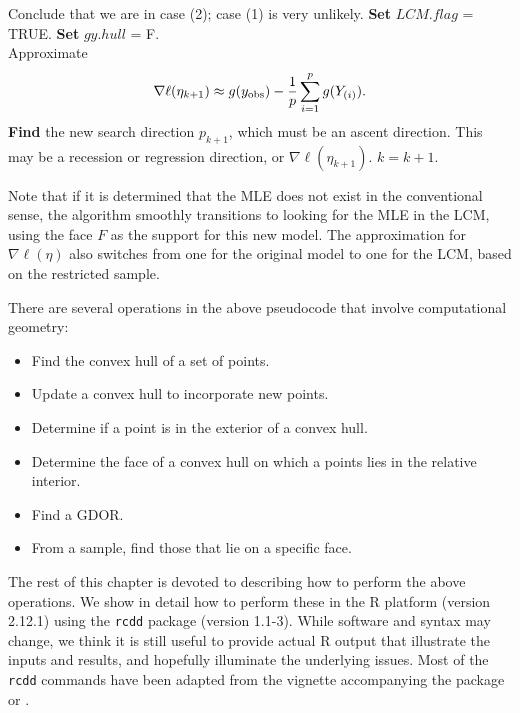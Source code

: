 {\begin{algorithmic}
			\State Conclude that we are in case (2); case (1) is very unlikely.
			\State \textbf{Set} $LCM.flag$ = TRUE.
			\State \textbf{Set} $gy.hull$ = F.
		\EndIf
	\EndIf
\EndIf\\
	\State Approximate 
	\begin{align} \label{E:nabla ell approx LCM}
	\nabla \ell( \eta_{k+1}) \approx g(y_{\text{obs}}) - \frac{1}{p}\sum_{i=1}^p g(Y_{(i)}).
	\end{align}
\State \textbf{Find} the new search direction $p_{k+1}$, which must be an ascent 
direction.
\State This may be a recession or regression direction, or $\nabla \ell( \eta_{k+1})$.
\State $k = k + 1$.
\EndWhile
\end{algorithmic}
}

Note that if it is determined that the MLE does not exist in the conventional sense,
the algorithm smoothly transitions to looking for the MLE in the LCM, using the 
face $F$ as the support for this new model.  The approximation for $\nabla \ell (\eta)$
also switches from one for the original model to one for the LCM, based on the restricted
sample.  

There are several operations in the above pseudocode that involve computational geometry:
\begin{itemize}
\item Find the convex hull of a set of points.
\item Update a convex hull to incorporate new points.
\item Determine if a point is in the exterior of a convex hull.
\item Determine the face of a convex hull on which a points lies in the relative interior.
\item Find a GDOR.
\item From a sample, find those that lie on a specific face.
\end{itemize}

The rest of this chapter is devoted to describing how to perform the above
operations.  We show in detail how to perform these in the R platform (version 2.12.1)
using the \texttt{rcdd} package (version 1.1-3).  While software and syntax may change,
we think it is still useful to provide actual R output that illustrate the
inputs and results, and hopefully illuminate the underlying issues.  Most of the  
\texttt{rcdd} commands have been adapted from the vignette accompanying the package
or \citep{Geyer:2009}.

